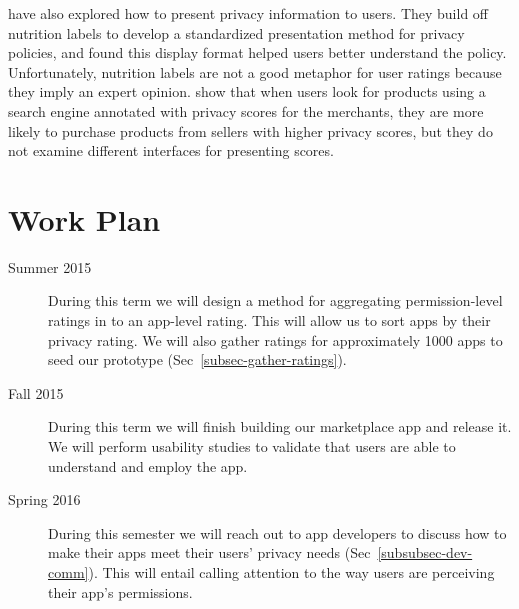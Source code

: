 \documentclass[11pt]{article}
\begin{document}
\citet{nutrition-labels-SOUPS09} have also explored how to 
present privacy information to users.
They build off nutrition labels to develop a standardized 
presentation method for privacy policies, and found this 
display format helped users better understand the policy. 
Unfortunately, nutrition labels are not a good 
metaphor for user ratings because they imply an expert 
opinion. \citet{privacy-purchasing-effect-INFORMS11} 
show that when users look for products using a search engine 
annotated with privacy scores for the merchants, they are more 
likely to purchase products from sellers with higher privacy scores,
but they do not examine different interfaces for presenting
scores.


\section{Work Plan}

\begin{description}

\item[Summer 2015]
During this term we will design a method for aggregating 
permission-level ratings in to an app-level rating. 
This will allow us to sort apps by their privacy rating.
We will also gather ratings for approximately 1000 apps 
to seed our prototype (Sec~\ref{subsec-gather-ratings}).


\item[Fall 2015]
During this term we will finish building our marketplace 
app and release it. We will perform usability studies to
validate that users are able to understand and employ
the app.

\item[Spring 2016] 
During this semester we will reach out to app developers to discuss
how to make their apps meet their users' privacy needs 
(Sec~\ref{subsubsec-dev-comm}). This will entail
calling attention to the way users are perceiving their app's
permissions.

\end{description}

\singlespacing
\end{document}
